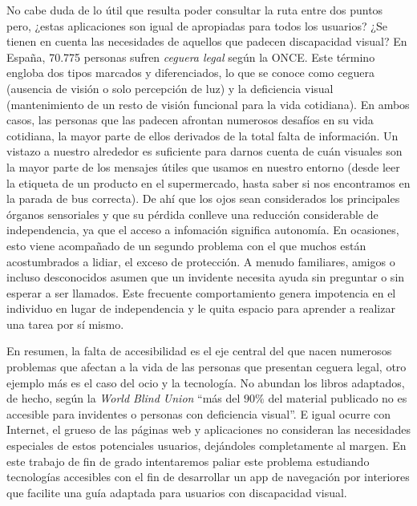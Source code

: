 No cabe duda de lo útil que resulta poder consultar la ruta entre dos puntos pero, ¿estas aplicaciones son igual de apropiadas para todos los usuarios? ¿Se tienen en cuenta las necesidades de aquellos que padecen discapacidad visual? En España, 70.775 personas sufren \textit{ceguera legal} según la ONCE. Este término engloba dos tipos marcados y diferenciados, lo que se conoce como ceguera (ausencia de visión o solo percepción de luz) y la deficiencia visual (mantenimiento de un resto de visión funcional para la vida cotidiana). En ambos casos, las personas que las padecen afrontan numerosos desafíos en su vida cotidiana, la mayor parte de ellos derivados de la total falta de información. Un vistazo a nuestro alrededor es suficiente para darnos cuenta de cuán visuales son la mayor parte de los mensajes útiles que usamos en nuestro entorno (desde leer la etiqueta de un producto en el supermercado, hasta saber si nos encontramos en la parada de bus correcta). De ahí que los ojos sean considerados los principales órganos sensoriales y que su pérdida conlleve una reducción considerable de independencia, ya que el acceso a infomación significa autonomía. En ocasiones, esto viene acompañado de un segundo problema con el que muchos están acostumbrados a lidiar, el exceso de protección. A menudo familiares, amigos o incluso desconocidos asumen que un invidente necesita ayuda sin preguntar o sin esperar a ser llamados. Este frecuente comportamiento genera impotencia en el individuo en lugar de independencia y le quita espacio para aprender a realizar una tarea por sí mismo. 

En resumen, la falta de accesibilidad es el eje central del que nacen numerosos problemas que afectan a la vida de las personas que presentan ceguera legal, otro ejemplo más es el caso del ocio y la tecnología. No abundan los libros adaptados, de hecho, según la \textit{ World Blind Union} ``más del $90\%$ del material publicado no es accesible para invidentes o personas con deficiencia visual''. E igual ocurre con Internet, el grueso de las páginas web y aplicaciones no consideran las necesidades especiales de estos potenciales usuarios, dejándoles completamente al margen. En este trabajo de fin de grado intentaremos paliar este problema estudiando tecnologías accesibles con el fin de desarrollar un app de navegación por interiores que facilite una guía adaptada para usuarios con discapacidad visual.


